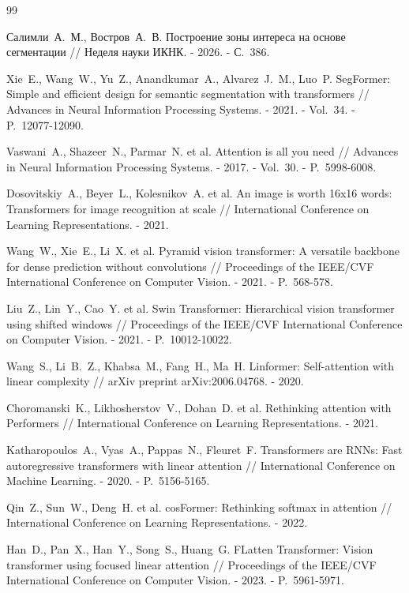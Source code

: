 \documentclass[a4paper,14pt]{article}
\numberwithin{figure}{section}
\numberwithin{table}{section}
\begin{document}
\renewcommand{\refname}{Список источников}
\begin{thebibliography}{99}

 Салимли~А.~М., Востров~А.~В. Построение зоны интереса на основе сегментации // Неделя науки ИКНК. - 2026. - С.~386.

 Xie~E., Wang~W., Yu~Z., Anandkumar~A., Alvarez~J.~M., Luo~P. SegFormer: Simple and efficient design for semantic segmentation with transformers // Advances in Neural Information Processing Systems. - 2021. - Vol.~34. - P.~12077-12090.

 Vaswani~A., Shazeer~N., Parmar~N. et al. Attention is all you need // Advances in Neural Information Processing Systems. - 2017. - Vol.~30. - P.~5998-6008.

 Dosovitskiy~A., Beyer~L., Kolesnikov~A. et al. An image is worth 16x16 words: Transformers for image recognition at scale // International Conference on Learning Representations. - 2021.

 Wang~W., Xie~E., Li~X. et al. Pyramid vision transformer: A versatile backbone for dense prediction without convolutions // Proceedings of the IEEE/CVF International Conference on Computer Vision. - 2021. - P.~568-578.

 Liu~Z., Lin~Y., Cao~Y. et al. Swin Transformer: Hierarchical vision transformer using shifted windows // Proceedings of the IEEE/CVF International Conference on Computer Vision. - 2021. - P.~10012-10022.

 Wang~S., Li~B.~Z., Khabsa~M., Fang~H., Ma~H. Linformer: Self-attention with linear complexity // arXiv preprint arXiv:2006.04768. - 2020.

 Choromanski~K., Likhosherstov~V., Dohan~D. et al. Rethinking attention with Performers // International Conference on Learning Representations. - 2021.

 Katharopoulos~A., Vyas~A., Pappas~N., Fleuret~F. Transformers are RNNs: Fast autoregressive transformers with linear attention // International Conference on Machine Learning. - 2020. - P.~5156-5165.

 Qin~Z., Sun~W., Deng~H. et al. cosFormer: Rethinking softmax in attention // International Conference on Learning Representations. - 2022.

 Han~D., Pan~X., Han~Y., Song~S., Huang~G. FLatten Transformer: Vision transformer using focused linear attention // Proceedings of the IEEE/CVF International Conference on Computer Vision. - 2023. - P.~5961-5971.


\end{thebibliography}
\end{document}
